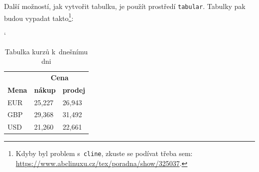\documentclass[a4paper, 11pt]{article}
\begin{document}
Další možností, jak vytvořit tabulku, je použít prostředí \texttt{tabular}. Tabulky pak budou vypadat takto\footnote{Kdyby byl problem s~\texttt{cline}, zkuste se podívat třeba sem: \href{https://www.abclinuxu.cz/tex/poradna/show/325037}{https://www.abclinuxu.cz/tex/poradna/show/325037}.}:
\bigskip
\begin{table}[h]

    \catcode`
    \centering
\begin{tabular}{|l|l|l|}

\hline
 & \multicolumn{2}{c|}{\textbf{Cena}} \\ \cline{2-3}
\textbf{Mena}                & \textbf{nákup}       & \textbf{prodej}      \\ \hline
EUR                                         & 25,227      & 26,943      \\
GBP                                         & 29,368      & 31,492      \\
USD                                         & 21,260      & 22,661      \\ \hline
\end{tabular}
\caption{\label{table:tab1}Tabulka kurzů k~dnešnímu dni}
\end{table}
\bigskip
\end{document}
